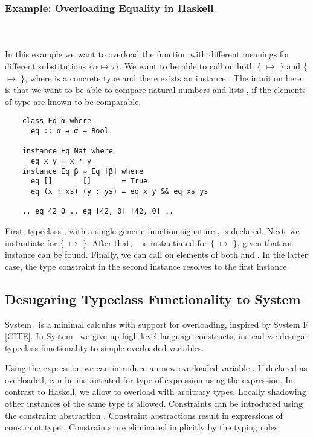 \subsubsection{Example: Overloading Equality in Haskell}\hfill\\\\
In this example we want to overload the function  with different meanings for different substitutions $\{α \mapsto τ\}$.
We want to be able to call  on both $\{$ $\mapsto$ $\}$ and $\{$ $\mapsto$ \inl{[β]}$\}$, where  is a concrete type and there exists an instance . The intuition here is that we want to be able to compare natural numbers  and lists \mono{[β]}, if the elements of type  are known to be comparable.
\begin{verbatim}
    class Eq α where
      eq :: α → α → Bool 

    instance Eq Nat where
      eq x y = x ≐ y
    instance Eq β ⇒ Eq [β] where
      eq []       []       = True
      eq (x : xs) (y : ys) = eq x y && eq xs ys 

    .. eq 42 0 .. eq [42, 0] [42, 0] ..
\end{verbatim}
First, typeclass , with a single generic function signature , is declared. Next, we instantiate  for $\{$ $\mapsto$ $\}$. 
After that, \  is instantiated for $\{$ $\mapsto$ \inl{[β]}$\}$, given that an instance  can be found.
Finally, we can call  on elements of both  and \inl{[Nat]}. In the latter case, the type constraint  in the second instance resolves to the first instance.

\subsection{Desugaring Typeclass Functionality to System \Fo}
System \Fo\ is a minimal calculus with support for overloading, inspired by System F [CITE]. 
In System \Fo\ we give up high level language constructs, instead we desugar typeclass functionality to simple overloaded variables. 

\noindent Using the  expression we can introduce an new overloaded variable . 
If declared as overloaded,  can be instantiated for type  of expression  using the  expression.
In contrast to Haskell, we allow to overload  with arbitrary types. 
Locally shadowing other instances of the same type is allowed.
Constraints can be introduced using the constraint abstraction . Constraint abstractions result in expressions of constraint type . 
Constraints are eliminated implicitly by the typing rules.

